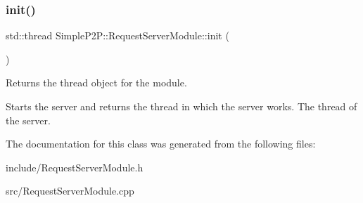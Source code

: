 \subsubsection{\texorpdfstring{init()}{init()}}
{\footnotesize\ttfamily std\+::thread Simple\+P2\+P\+::\+Request\+Server\+Module\+::init (\begin{DoxyParamCaption}{ }\end{DoxyParamCaption})}



Returns the thread object for the module. 

Starts the server and returns the thread in which the server works. The thread of the server. 

The documentation for this class was generated from the following files\+:\begin{DoxyCompactItemize}
\item 
include/Request\+Server\+Module.\+h\item 
src/Request\+Server\+Module.\+cpp\end{DoxyCompactItemize}
